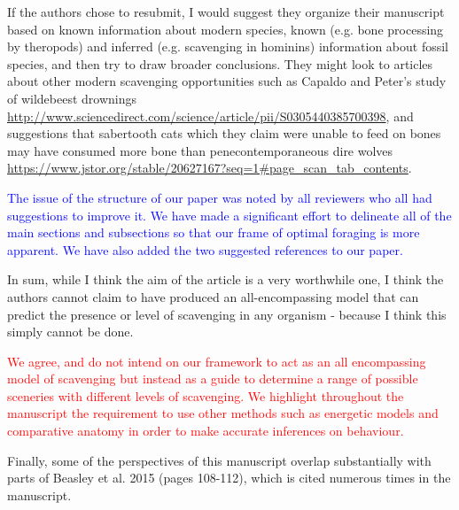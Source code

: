 \documentclass[12pt,letterpaper]{article}
\begin{document}


\bigskip

If the authors chose to resubmit, I would suggest they organize their manuscript based on known information about modern species, known (e.g. bone processing by theropods) and inferred (e.g. scavenging in hominins) information about fossil species, and then try to draw broader conclusions.
They might look to articles about other modern scavenging opportunities such as Capaldo and Peter's study of wildebeest drownings \url{http://www.sciencedirect.com/science/article/pii/S0305440385700398}, and suggestions that sabertooth cats which they claim were unable to feed on bones may have consumed more bone than penecontemporaneous dire wolves \url{https://www.jstor.org/stable/20627167?seq=1#page_scan_tab_contents}. 

\bigskip

\textcolor{blue}{The issue of the structure of our paper was noted by all reviewers who all had suggestions to improve it. 
We have made a significant effort to delineate all of the main sections and subsections so that our frame of optimal foraging is more apparent.
We have also added the two suggested references to our paper.}

\bigskip
In sum, while I think the aim of the article is a very worthwhile one, I think the authors cannot claim to have produced an all-encompassing model that can predict the presence or level of scavenging in any organism - because I think this simply cannot be done.

\textcolor{red}{We agree, and do not intend on our framework to act as an all encompassing model of scavenging but instead as a guide to determine a range of possible sceneries with different levels of scavenging. We highlight throughout the manuscript the requirement to use other methods such as energetic models and comparative anatomy in order to make accurate inferences on behaviour.}


Finally, some of the perspectives of this manuscript overlap substantially with parts of Beasley et al. 2015 (pages 108-112), which is cited numerous times in the manuscript.
\bigskip
\end{document}
